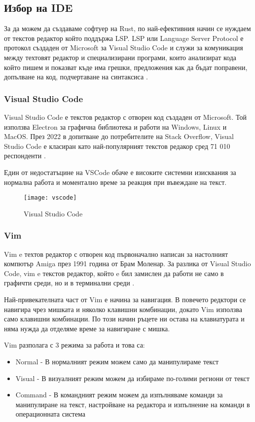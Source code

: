 \subsection{Избор на IDE}
За да можем да създаваме софтуер на Rust, по най-ефективния начин се нуждаем от
текстов редактор който поддържа LSP. LSP или Language Server Protocol е
протокол създаден от Microsoft за Visual Studio Code и служи за комуникация
между техтовят редактор и специализирани програми, които анализират кода който
пишем и показват къде има грешки, предложения как да бъдат поправени, допълване
на код, подчертаване на синтаксиса \cite{lsp_wikipedia}.

\subsubsection{Visual Studio Code}
Visual Studio Code е текстов редактор с отворен код създаден от Microsoft. Той
използва Electron за графична библиотека и работи на Windows, Linux и MacOS. 
През 2022 в допитване до потребителите на Stack Overflow, Visual Studio Code е
класиран като най-популярният текстов редакор сред 71 010 респонденти
\cite{vscode_wikipedia}.


Един от недостатъцине на VSCode обаче е високите системни изисквания за
нормална работа и моментално време за реакция при въвеждане на текст.
\begin{figure}[!htb]
  \texttt{[image: vscode]}
  \centering
  \caption{Visual Studio Code}
  \label{fig:vscode}
\end{figure}

\subsubsection{Vim}
Vim e техтов редактор с отворен код първоначално написан за настолният компютър
Amiga\cite{amiga_wikipedia} през 1991 година от Брам Моленар. За разлика от
Visual Studio Code, vim e текстов редактор, който e бил замислен да работи не
само в графичти среди, но и в терминални среди \cite{vim_wikipedia}. 

Най-привекателната част от Vim е начина за навигация. В повечето редктори се
навигира чрез мишката и няколко клавишни комбинации, докато Vim използва само
клавишни комбинации. По този начин ръцете ни остава на клавиатурата и няма
нужда да отделяме време за навигиране с мишка. 

Vim разполага с 3 режима за работа и това са:
\begin{itemize}
\item Normal - В нормалният режим можем само да манипулираме текст
\item Visual - В визуалният режим можем да избираме по-голими региони от текст
\item Command - В командният режим можем да изпълняваме команди за манипулиране
на текст, настройване на редактора и изпълнение на команди в операционната
система \end{itemize}


